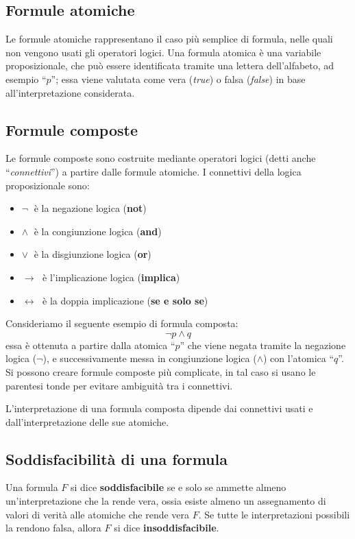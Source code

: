\documentclass[a4paper,12pt]{report}
\newcommand{\tto} {\leftrightarrow}
\begin{document}
\subsection{Formule atomiche}
Le formule atomiche rappresentano il caso più semplice di formula, nelle quali non vengono usati gli operatori logici. Una formula atomica è una variabile proposizionale, che può essere identificata tramite una lettera dell'alfabeto, ad esempio ``$p$''; essa viene valutata come vera (\emph{true}) o falsa (\emph{false}) in base all'interpretazione considerata. 

\subsection{Formule composte}
Le formule composte sono costruite mediante operatori logici (detti anche ``\emph{connettivi}'') a partire dalle formule atomiche. I connettivi della logica proposizionale sono:
\begin{itemize}
    \item $\lnot \;$ è la negazione logica (\textbf{not})
    \item $\land \;$ è la congiunzione logica (\textbf{and})
    \item $\lor \;$ è la disgiunzione logica (\textbf{or})
    \item $\to\;$ è l'implicazione logica (\textbf{implica})
    \item $\tto\;$ è la doppia implicazione (\textbf{se e solo se})
\end{itemize}
Consideriamo il seguente esempio di formula composta: 
\[ \lnot p \land q\] essa è ottenuta a partire dalla atomica ``$p$'' che viene negata tramite la negazione logica ($\lnot$), e successivamente messa in congiunzione logica ($\land$) con l'atomica ``$q$''. 
Si possono creare formule composte più complicate, in tal caso si usano le parentesi tonde per evitare ambiguità tra i connettivi.

L'interpretazione di una formula composta dipende dai connettivi usati e dall'interpretazione delle sue atomiche.

\subsection{Soddisfacibilità di una formula}
Una formula $F$ si dice \textbf{soddisfacibile} se e solo se ammette almeno un'interpretazione che la rende vera, ossia esiste almeno un assegnamento di valori di verità alle atomiche che rende vera $F$. Se tutte le interpretazioni possibili la rendono falsa, allora $F$ si dice \textbf{insoddisfacibile}.
\end{document}
